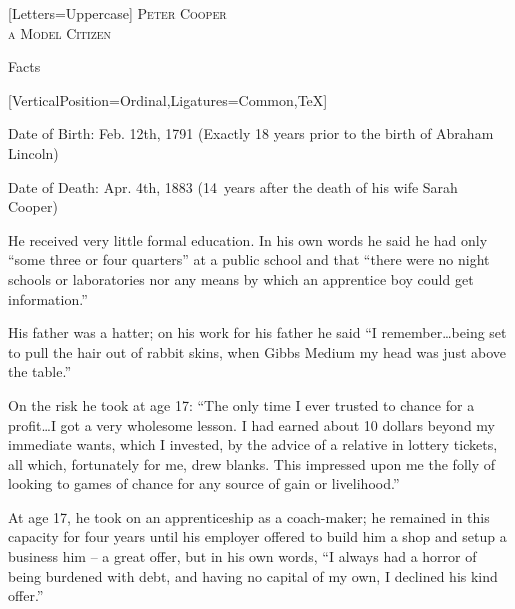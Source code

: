 \documentclass{article}
\begin{document}
\centering
{}[Letters=Uppercase]
\fontsize{0.8in}{0.6in}\selectfont
\scshape 
{} Peter Cooper \\
 a Model Citizen

\vspace{0.05in}

\fontsize{16pt}{16pt}\selectfont
{}
\justify
Facts %

\vspace{0.1in}

\begin{minipage}[t]{0.46\linewidth}
[VerticalPosition=Ordinal,Ligatures={Common,TeX}]
\fontsize{10.7pt}{12.7pt}\selectfont
\raggedright
\upshape
\begin{enumList}

\item Date of Birth: Feb. 12th, 1791 (Exactly 18 years prior to the birth of
{ Abraham Lincoln})

\item Date of Death: Apr. 4th, 1883 (14~years after the death of his wife
{ Sarah Cooper})

\item He received { very little formal education}. In his
own words he said he had
only ``some three or four quarters'' at a public school and that ``there were no
night schools or laboratories nor any means by which an apprentice boy could get
information.''

\item His father was a hatter; on his work for his father he said ``I
remember\ldots being set to pull the hair out of rabbit skins, when {\fontspec
{Gibbs Medium} my head was just above the table}.''

\item On the risk he took at age 17: ``The only time I ever trusted to chance
for a profit\ldots I got a very wholesome lesson. I had earned about 10 dollars
beyond my immediate wants, which I invested, by the advice of a relative in
lottery tickets, all which, fortunately for me, drew blanks. This impressed
upon me the { folly of looking to games of chance} for any
source of gain or livelihood.''

\item At age 17, he took on an apprenticeship as a coach-maker; he remained in
this capacity for four years until his employer offered to build him a shop and
setup a business him -- a great offer, but in his own words, ``I always had a
{ horror of being burdened with debt}, and having no
capital of my own, { I declined his kind offer}.''


\end{enumList}
\end{minipage}
\end{document}
